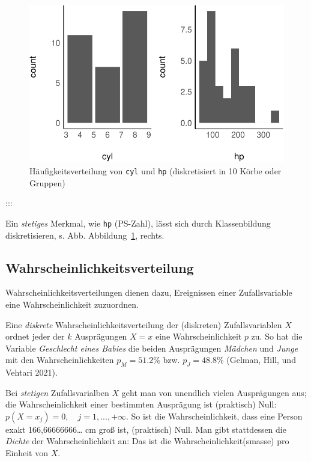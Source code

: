 \documentclass[
  a4paper,
  DIV=11]{scrreprt}
\theoremstyle{definition}
\theoremstyle{remark}
\begin{document}
\begin{figure}

{\centering \includegraphics{./Verteilungen_files/figure-pdf/fig-mtcars-freq-1.pdf}

}

\caption{\label{fig-mtcars-freq}Häufigkeitsverteilung von \texttt{cyl}
und \texttt{hp} (diskretisiert in 10 Körbe oder Gruppen)}

\end{figure}

:::

Ein \emph{stetiges} Merkmal, wie \texttt{hp} (PS-Zahl), lässt sich durch
Klassenbildung diskretisieren, s. Abb. Abbildung~\ref{fig-mtcars-freq},
rechts.

\hypertarget{wahrscheinlichkeitsverteilung}{%
\subsection{Wahrscheinlichkeitsverteilung}\label{wahrscheinlichkeitsverteilung}}

Wahrscheinlichkeitsverteilungen dienen dazu, Ereignissen einer
Zufallsvariable eine Wahrscheinlichkeit zuzuordnen.

Eine \emph{diskrete} Wahrscheinlichkeitsverteilung der (diskreten)
Zufallsvariablen \(X\) ordnet jeder der \(k\) Ausprägungen \(X=x\) eine
Wahrscheinlichkeit \(p\) zu. So hat die Variable \emph{Geschlecht eines
Babies} die beiden Ausprägungen \emph{Mädchen} und \emph{Junge} mit den
Wahrscheinlichkeiten \(p_M = 51.2\%\) bzw. \(p_J = 48.8\%\) (Gelman,
Hill, und Vehtari 2021).

Bei \emph{stetigen} Zufallsvarialben \(X\) geht man von unendlich vielen
Ausprägungen aus; die Wahrscheinlichkeit einer bestimmten Ausprägung ist
(praktisch) Null: \(p(X=x_j)=0, \quad j=1,...,+\infty\). So ist die
Wahrscheinlichkeit, dass eine Person exakt 166,66666666\ldots{} cm groß
ist, (praktisch) Null. Man gibt stattdessen die \emph{Dichte} der
Wahrscheinlichkeit an: Das ist die Wahrscheinlichkeit(smasse) pro
Einheit von \(X\).
\end{document}
